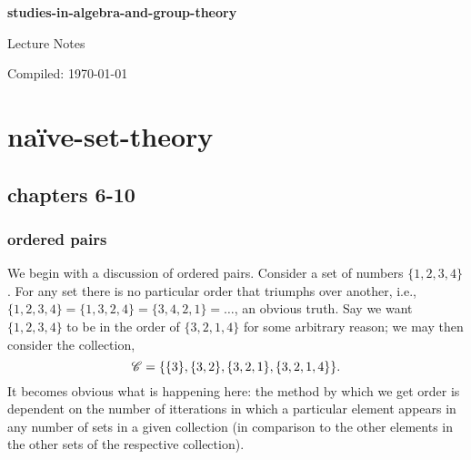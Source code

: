 \documentclass[12pt,oneside]{report}
\begin{document}
\begin{titlepage}
    \centering
    \vspace*{2cm}
    {\Huge\bfseries studies-in-algebra-and-group-theory\par}
    \vspace{1cm}
    {\Large Lecture Notes\par}
    \vspace{2cm}
    {\Large Compiled: \today\par}
\end{titlepage}

\tableofcontents
\newpage

\pagestyle{head}




\section{na\"{i}ve-set-theory}


\subsection{chapters 6-10}
\subsubsection{ordered pairs}
We begin with a discussion of ordered pairs. Consider a set of numbers \( \{1,2,3,4\}   \). For any set there is no particular order that triumphs over another, i.e., \( \{1,2,3,4\} = \{1,3,2,4\} = \{3,4,2,1\} =\ldots     \), an obvious truth. Say we want \( \{1,2,3,4\}   \) to be in the order of \( \{3,2,1,4\}   \) for some arbitrary reason; we may then consider the collection,
\[
  {\mathscr{C}} = \{\{3\} , \{3,2\} ,\{3,2,1\} , \{3,2,1,4\}     \}
.\] 
It becomes obvious what is happening here: the method by which we get order is dependent on the number of itterations in which a particular element appears in any number of sets in a given collection (in comparison to the other elements in the other sets of the respective collection). 
\end{document}
